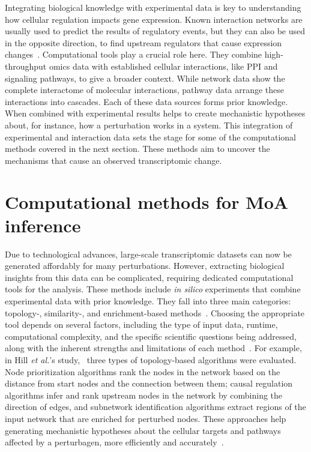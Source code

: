 Integrating biological knowledge with experimental data is key to understanding how cellular regulation impacts gene expression. Known interaction networks are usually used to predict the results of regulatory events, but they can also be used in the opposite direction, to find upstream regulators that cause expression changes~\cite{RN131}. Computational tools play a crucial role here. They combine high-throughput omics data with established cellular interactions, like \gls{PPI} and signaling pathways, to give a broader context. While network data show the complete interactome of molecular interactions, pathway data arrange these interactions into cascades. Each of these data sources forms prior knowledge. When combined with experimental results helps to create mechanistic hypotheses about, for instance, how a perturbation works in a system. This integration of experimental and interaction data sets the stage for some of the computational methods covered in the next section. These methods aim to uncover the mechanisms that cause an observed transcriptomic change.

\section{Computational methods for MoA inference} %
\label{sec:ComputationalmethodsforMoAinference}

Due to technological advances, large-scale transcriptomic datasets can now be generated affordably for many perturbations. 
However, extracting biological insights from this data can be complicated, requiring dedicated computational tools for the analysis. 
These methods include \textit{in silico} experiments that combine experimental data with prior knowledge. 
They fall into three main categories: topology-, similarity-, and enrichment-based methods~\cite{RN57, RN56}. 
Choosing the appropriate tool depends on several factors, including the type of input data, runtime, computational complexity, and the specific scientific questions being addressed, along with the inherent strengths and limitations of each method~\cite{RN38}. 
For example, in Hill \textit{et al.}'s study,~\cite{RN37} three types of topology-based algorithms were evaluated. 
Node prioritization algorithms rank the nodes in the network based on the distance from start nodes and the connection between them; causal regulation algorithms infer and rank upstream nodes in the network by combining the direction of edges, and subnetwork identification algorithms extract regions of the input network that are enriched for perturbed nodes. 
These approaches help generating mechanistic hypotheses about the cellular targets and pathways affected by a perturbagen, more efficiently and accurately~\cite{RN100}. 

